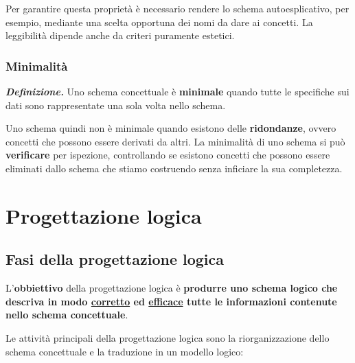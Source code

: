 \documentclass[a4paper]{article}
\begin{document}
	\noindent
	Per garantire questa proprietà è necessario rendere lo schema autoesplicativo, \textcolor{Green4}{per esempio}, mediante una scelta opportuna dei nomi da dare ai concetti. La leggibilità dipende anche da criteri puramente estetici.
	
	\subsubsection{Minimalità}\label{minimalità}
	
	\textcolor{Red3}{\textbf{\emph{Definizione.}}} Uno schema concettuale è \textbf{minimale} quando tutte le specifiche sui dati sono rappresentate una sola volta nello schema.\newline
	
	\noindent
	Uno schema quindi non è minimale quando esistono delle \textbf{ridondanze}, ovvero concetti che possono essere derivati da altri. La minimalità di uno schema si può \textbf{verificare} per ispezione, controllando se esistono concetti che possono essere eliminati dallo schema che stiamo costruendo senza inficiare la sua completezza.
	
	\newpage
	
	\section{Progettazione logica}
	
	\subsection{Fasi della progettazione logica}
	
	L'\textcolor{Red3}{\textbf{obbiettivo}} della progettazione logica è \textbf{produrre uno schema logico che descriva in modo \underline{corretto} ed \underline{efficace} tutte le informazioni contenute nello schema concettuale}.
	
	Le attività principali della progettazione logica sono la riorganizzazione dello schema concettuale e la traduzione in un modello logico:
	
\end{document}
